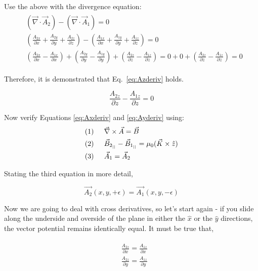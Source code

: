 \documentclass[12pt]{article}
\begin{document}
\begin{flushleft}
Use the above with the divergence equation:
\begin{eqnarray*}
\begin{aligned}
&\left( \vec{\nabla} \cdot \vec{A}_{2} \right) - \left( \vec{\nabla} \cdot \vec{A}_{1} \right) = 0 \\
& \left( \frac{A_{2x}}{\partial x} + \frac{A_{2y}}{\partial y} + \frac{A_{2z}}{\partial z} \right) - 
\left( \frac{A_{1x}}{\partial x} + \frac{A_{1y}}{\partial y} + \frac{A_{1z}}{\partial z} \right) = 0 \\
& \left( \frac{A_{2x}}{\partial x} - \frac{A_{1x}}{\partial x} \right) + \left( \frac{A_{2y}}{\partial y} - \frac{A_{1y}}{\partial y}  \right) + \left( \frac{A_{2z}}{\partial z} - \frac{A_{1z}}{\partial z} \right) = 0 + 0 + \left( \frac{A_{2z}}{\partial z} - \frac{A_{1z}}{\partial z} \right) = 0
\end{aligned}
\end{eqnarray*}

Therefore, it is demonstrated that Eq.~\ref{eq:Azderiv} holds.

\[
\frac{A_{2z}}{\partial z} - \frac{A_{1z}}{\partial z} = 0
\]

Now verify Equations \ref{eq:Axderiv}  and \ref{eq:Ayderiv} using:
\begin{eqnarray*}
\begin{aligned}
& \text{(1)} \hspace{.2in} \vec{\nabla} \times \vec{A} = \vec{B} \\
& \text{(2)} \hspace{.2in} \vec{B}_{2_{||}} - \vec{B}_{1_{||}} = \mu_{0} (\vec{K} \times \hat{z}) \\
& \text{(3)} \hspace{.2in} \vec{A}_{1}=\vec{A}_{2}
\end{aligned}
\end{eqnarray*}

Stating the third equation in more detail,

\[
\vec{A_{2}}(x,y,+\epsilon) = \vec{A_{1}}(x,y,-\epsilon)
\]

Now we are going to deal with cross derivatives, so let's start again - if you slide along the underside and overside of the plane in either the $\hat{x}$ or the $\hat{y}$ directions, the vector potential remains identically equal.  It must be true that,

\begin{eqnarray*}
\begin{aligned}
& \frac{A_{2z}}{\partial x}  = \frac{A_{1z}}{\partial x} \\
& \frac{A_{2z}}{\partial y} = \frac{A_{1z}}{\partial y} 
\end{aligned}
\end{eqnarray*}


\end{flushleft}
\end{document}
